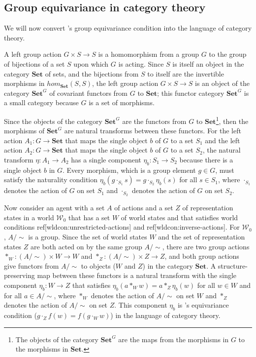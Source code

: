 \subsection{Group equivariance in category theory}\label{sec:Group equivariance in category theory}

We will now convert \autocite{Higgins2018}'s group equivariance condition into the language of category theory.

A left group action $G \times S \to S$ is a homomorphism from a group $G$ to the group of bijections of a set $S$ upon which $G$ is acting.
Since $S$ is itself an object in the category $\textbf{Set}$ of sets, and the bijections from $S$ to itself are the invertible morphisms in $hom_{\textbf{Set}}(S, S)$, the left group action $G \times S \to S$ is an object of the category $\textbf{Set}^{G}$ of covariant functors from $G$ to $\textbf{Set}$; this functor category $\textbf{Set}^{G}$ is a small category because $G$ is a set of morphisms.

Since the objects of the category $\textbf{Set}^{G}$ are the functors from $G$ to $\textbf{Set}$\footnote{The objects of the category $\textbf{Set}^{G}$ are the maps from the morphisms in $G$ to the morphisms in $\textbf{Set}$.}, then the morphisms of $\textbf{Set}^{G}$ are natural transforms between these functors.
For the left action $A_1: G \to \textbf{Set}$ that maps the single object $b$ of $G$ to a set $S_1$ and the left action $A_2: G \to \textbf{Set}$ that maps the single object $b$ of $G$ to a set $S_2$, the natural transform $\eta : A_1 \to A_2$ has a single component $\eta_{b} : S_1 \to S_2$ because there is a single object $b$ in $G$.
Every morphism, which is a group element $g \in G$, must satisfy the naturality condition $\eta_{b}(g \cdot_{S_1} s) = g \cdot_{S_2} \eta_{b}(s)$ for all $s \in S_1$, where $\cdot_{S_1}$ denotes the action of $G$ on set $S_1$ and $\cdot_{S_2}$ denotes the action of $G$ on set $S_2$.

Now consider an agent with a set $A$ of actions and a set $Z$ of representation states in a world $\mathscr{W}_{0}$ that has a set $W$ of world states and that satisfies world conditions ref[wldcon:unrestricted-actions] and ref[wldcon:inverse-actions].
For $\mathscr{W}_{0}$, $A/\sim$ is a group.
Since the set of world states $W$ and the set of representation states $Z$ are both acted on by the same group $A/\sim$, there are two group actions $*_{W}: (A/\sim) \times W \to W$ and $*_{Z}: (A/\sim) \times Z \to Z$, and both group actions give functors from $A/\sim$ to objects ($W$ and $Z$) in the category $\textbf{Set}$.
A structure-preserving map between these functors is a natural transform with the single component $\eta_{b}: W \to Z$ that satisfies $\eta_{b}(a *_{W} w) = a *_{Z} \eta_{b}(w)$ for all $w \in W$ and for all $a \in A/\sim$, where $*_{W}$ denotes the action of $A/\sim$ on set $W$ and $*_{Z}$ denotes the action of $A/\sim$ on set $Z$.
This component $\eta_{b}$ is \autocite{Higgins2018}'s equivariance condition ($g \cdot_{Z} f(w) = f(g \cdot_{W} w)$) in the language of category theory.

